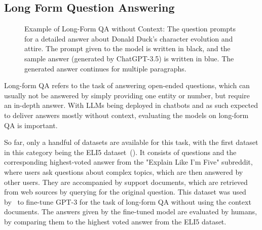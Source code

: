 \subsection{Long Form Question Answering}\label{sec:long-form-qa}
\begin{figure}[tb]
    \centering
    \caption{Example of Long-Form QA without Context: The question prompts for a detailed answer about Donald Duck's character evolution and attire. The prompt given to the model is written in black, and the sample answer (generated by ChatGPT-3.5) is written in blue. The generated answer continues for multiple paragraphs.}
    \label{fig:long_form_qa_example_with_answer}
\end{figure}
Long-form QA refers to the task of answering open-ended questions, which can usually not be answered by simply providing one entity or number, but require an in-depth answer.
With LLMs being deployed in chatbots and as such expected to deliver answers mostly without context, evaluating the models on long-form QA is important.

So far, only a handful of datasets are available for this task, with the first dataset in this category being the ELI5 dataset~(\cite{fan:2019:ELI5}).
It consists of questions and the corresponding highest-voted answer from the "Explain Like I'm Five" subreddit, where users ask questions about complex topics, which are then answered by other users.
They are accompanied by support documents, which are retrieved from web sources by querying for the original question.
This dataset was used by~\cite{nakano:2021:Webgpt} to fine-tune GPT-3 for the task of long-form QA without using the context documents.
The answers given by the fine-tuned model are evaluated by humans, by comparing them to the highest voted answer from the ELI5 dataset.

